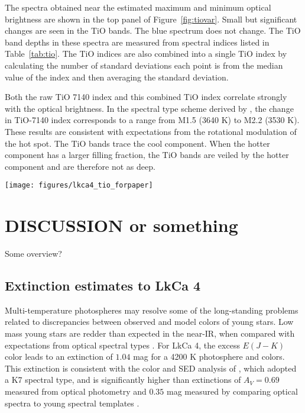 \documentclass[twocolumn]{emulateapj}%
\begin{document}
The spectra obtained near the estimated maximum and minimum optical brightness are shown in the top panel of Figure~\ref{fig:tiovar}.  Small but significant changes are seen in the TiO bands.  The blue spectrum does not change.  The TiO band depths in these spectra are measured from spectral indices listed in Table~\ref{tab:tio}.  The TiO indices are also combined into a single TiO index by calculating the number of standard deviations each point is from the median value of the index and then averaging the standard deviation.  

Both the raw TiO 7140 index and this combined TiO index correlate strongly with the optical brightness.  In the spectral type scheme derived by \citet{herczeg14}, the change in TiO-7140 index corresponds to a range from M1.5 (3640 K) to M2.2 (3530 K).  These results are consistent with expectations from the rotational modulation of the hot spot.  The TiO bands trace the cool component.  When the hotter component has a larger filling fraction, the TiO bands are veiled by the hotter component and are therefore not as deep.


\begin{figure*}
 \centering
 \texttt{[image: figures/lkca4\_tio\_forpaper]}
 \caption{Variability in TiO bands measured with ESPaDOnS (see also Table X).  The V-band emission is estimated from fits to the ASAS-SN lightcurve obtained during the same period.  The main panel shows a correlation between V-band magnitude and the TiO-7140 index, while the inset shows a similar correlation with the average of the TiO 6200, CaH 6800, and TiO 7600 indices.}
 \label{fig:tiovar}
\end{figure*}

\section{DISCUSSION or something}

Some overview?


\subsection{Extinction estimates to LkCa 4}

Multi-temperature photospheres may resolve some of the long-standing problems related to discrepancies between observed and model colors of young stars.  Low mass young stars are redder than expected in the near-IR, when compared with expectations from optical spectral types \citep[e.g.][]{tottle15}.  For LkCa 4, the excess $E(J-K)$ color leads to an extinction of $1.04$ mag for a 4200 K photosphere and \citep{pecaut13} colors.  This extinction is consistent with the color and SED analysis of \citet{furlan06}, which adopted a K7 spectral type, and is significantly higher than extinctions of $A_V=0.69$ measured from optical photometry \citep{kenyon95} and $0.35$ mag measured by comparing optical spectra to young spectral templates \citep{herczeg14}.  
\end{document}
